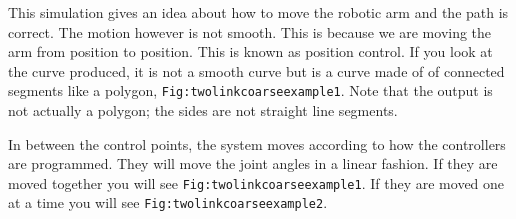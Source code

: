 This simulation gives an idea about how to move the robotic arm and the
path is correct. The motion however is not smooth. This is because we
are moving the arm from position to position. This is known as position
control. If you look at the curve produced, it is not a smooth curve but
is a curve made of of connected segments like a polygon,
\texttt{Fig:twolinkcoarseexample1}. Note that the output is not actually
a polygon; the sides are not straight line segments.

In between the control points, the system moves according to how the
controllers are programmed. They will move the joint angles in a linear
fashion. If they are moved together you will see
\texttt{Fig:twolinkcoarseexample1}. If they are moved one at a time you
will see \texttt{Fig:twolinkcoarseexample2}.

